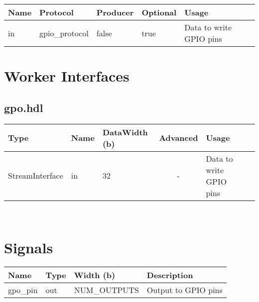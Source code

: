 \begin{landscape}
        \begin{scriptsize}
                \begin{tabular}{|M{2.5cm}|M{2cm}|M{2cm}|M{3cm}|M{11cm}|}
                        \hline
                        Name & Protocol & Producer & Optional & Usage\\
                        \hline
                        in
                        & gpio\_protocol
                        & false
                        & true
                        & Data to write GPIO pins \\
                        \hline
                \end{tabular}
			\end{scriptsize}
			
\section*{Worker Interfaces}
\subsection*{gpo.hdl}
\begin{scriptsize}
\begin{tabular}{|M{5cm}|M{4cm}|M{4cm}|c|M{6.5cm}|M{6cm}|}
            \hline
            Type    & Name & DataWidth (b) & Advanced  & Usage     \\
            \hline
            StreamInterface & in   & 32  & - & Data to write GPIO pins \\
           \hline

\end{tabular}
\end{scriptsize} \\

	
\section*{Signals}
	\begin{scriptsize}
		\begin{tabular}{|M{2.5cm}|M{3cm}|M{6.5cm}|M{9.2cm}|}
			\hline
			Name         & Type   & Width (b) & Description                       \\
			\hline
			gpo\_pin    & out & NUM\_OUTPUTS & Output to GPIO pins            \\
			\hline
		\end{tabular}
	\end{scriptsize}
\end{landscape}

